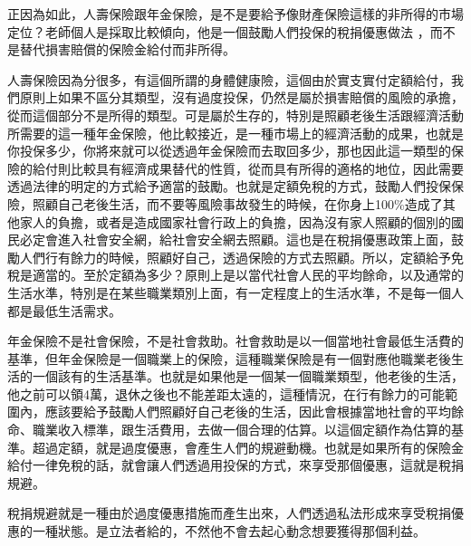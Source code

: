 \documentclass[oneside,sub3section]{ctexbook}
\begin{document}
正因為如此，人壽保險跟年金保險，是不是要給予像財產保險這樣的非所得的市場定位？老師個人是採取比較傾向，他是一個鼓勵人們投保的稅捐優惠做法
，而不是替代損害賠償的保險金給付而非所得。

人壽保險因為分很多，有這個所謂的身體健康險，這個由於實支實付定額給付，我們原則上如果不區分其類型，沒有過度投保，仍然是屬於損害賠償的風險的承擔，從而這個部分不是所得的類型。可是屬於生存的，特別是照顧老後生活跟經濟活動所需要的這一種年金保險，他比較接近，是一種市場上的經濟活動的成果，也就是你投保多少，你將來就可以從透過年金保險而去取回多少，那也因此這一類型的保險的給付則比較具有經濟成果替代的性質，從而具有所得的適格的地位，因此需要透過法律的明定的方式給予適當的鼓勵。也就是定額免稅的方式，鼓勵人們投保保險，照顧自己老後生活，而不要等風險事故發生的時候，在你身上100\%造成了其他家人的負擔，或者是造成國家社會行政上的負擔，因為沒有家人照顧的個別的國民必定會進入社會安全網，給社會安全網去照顧。這也是在稅捐優惠政策上面，鼓勵人們行有餘力的時候，照顧好自己，透過保險的方式去照顧。所以，定額給予免稅是適當的。至於定額為多少？原則上是以當代社會人民的平均餘命，以及通常的生活水準，特別是在某些職業類別上面，有一定程度上的生活水準，不是每一個人都是最低生活需求。

年金保險不是社會保險，不是社會救助。社會救助是以一個當地社會最低生活費的基準，但年金保險是一個職業上的保險，這種職業保險是有一個對應他職業老後生活的一個該有的生活基準。也就是如果他是一個某一個職業類型，他老後的生活，他之前可以領4萬，退休之後也不能差距太遠的，這種情況，在行有餘力的可能範圍內，應該要給予鼓勵人們照顧好自己老後的生活，因此會根據當地社會的平均餘命、職業收入標準，跟生活費用，去做一個合理的估算。以這個定額作為估算的基準。超過定額，就是過度優惠，會產生人們的規避動機。也就是如果所有的保險金給付一律免稅的話，就會讓人們透過用投保的方式，來享受那個優惠，這就是稅捐規避。

稅捐規避就是一種由於過度優惠措施而產生出來，人們透過私法形成來享受稅捐優惠的一種狀態。是立法者給的，不然他不會去起心動念想要獲得那個利益。
\end{document}
